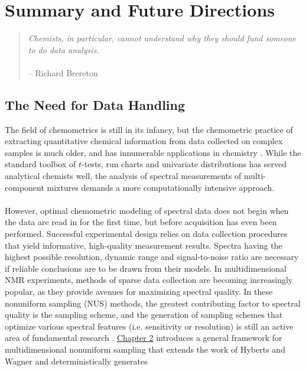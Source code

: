 
\chapter{Summary and Future Directions}

\begin{quote}
{\it
  Chemists, in particular, cannot understand why they should fund
  someone to do data analysis.}
\\\\
 -- Richard Brereton \cite{brereton:jchemo2014b}
\end{quote}

\section{The Need for Data Handling}

\begin{doublespace}
The field of chemometrics is still in its infancy, but the chemometric
practice of extracting quantitative chemical information from data collected
on complex samples is much older, and has innumerable applications in
chemistry \cite{wold:cils1995,brereton:jchemo2014b}. While the standard
toolbox of $t$-tests, run charts and univariate distributions has served
analytical chemists well, the analysis of spectral measurements of
multi-component mixtures demands a more computationally intensive
approach.
\\\\
However, optimal chemometric modeling of spectral data does not begin when
the data are read in for the first time, but before acquisition has even
been performed. Successful experimental design relies on data collection
procedures that yield informative, high-quality measurement results. Spectra
having the highest possible resolution, dynamic range and signal-to-noise
ratio are necessary if reliable conclusions are to be drawn from their models.
In multidimensional NMR experiments, methods of sparse data collection are
becoming increasingly popular, as they provide avenues for maximizing spectral
quality. In these nonuniform sampling (NUS) methods, the greatest contributing
factor to spectral quality is the sampling scheme, and the generation of
sampling schemes that optimize various spectral features (i.e. sensitivity
or resolution) is still an active area of fundamental research
\cite{mobli:jmr2015}. \hyperlink{chapter.2}{Chapter 2} introduces a general
framework for multidimensional nonuniform sampling that extends the work of
Hyberts and Wagner \cite{hyberts:jacs2010} and deterministically generates

\end{doublespace}
